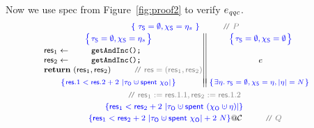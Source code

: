 Now we use spec from Figure~\ref{fig:proof2} to verify $e_{\mathit{qqc}}$.
%
\[
{\small{
\!\!\!\!\!\!\!\!
\begin{array}{c}
  ~~~~~~~~\spec{~
  \tkns = \emptyset,
  \hists = \gists
~} ~\comm{P}
\\[2pt]
%
% 
  \begin{tabular}{c || c}
$
\spec{\!\!\!
    \begin{array}{c}
    \tkns = \emptyset,
    \hists = \gists
  \end{array}\!\!\!}
$
&
$
\spec{\!\!\!\begin{array}{c}
    \tkns = \emptyset,
    \hists = \emptyset
  \end{array}\!\!\!}
$
\\[3pt]
   $\begin{array}{l}
      \res_1 \Asgn \esc{getAndInc();}\\[1pt]
      \res_2 \Asgn \esc{getAndInc();}\\[1pt]
      \kw{return}~(\res_1, \res_2) ~\comm{\res = (\res_1, \res_2)}\!\!\!
    \end{array}$
\!\!\!\!\!\!
& ${\small{e}}$ 
\\\\[-5pt] 
$
\spec{\!\!\!
{\scriptsize{
  \begin{array}{c}
    \res.1 < \res.2 + 2 \ |\tkno \hunion \Tomb~\histo|
  \end{array}
}}
  \!\!\!}$
\!\!
&
\!\!$\spec{\!\!\!
{\scriptsize{
  \begin{array}{c}
    \exists \gist \ldot 
    \tkns = \emptyset,
    \hists = \gist, 
    |\gist| = N
  \end{array}
}}
\!\!\!}$
\end{tabular}
\\\\[-5pt]
\comm{\res_1 := \res.1.1, \res_2 := \res.1.2}
\\\\[-6pt]
\spec{
\res_1 < \res_2 + 2 \ |\tkno \hunion \Tomb~(\histo \hunion \gist)|
}
\\[3pt]
~~~~~~~~\spec{
\res_1 < \res_2 + 2 \ |\tkno \hunion \Tomb~\histo| + 2 \ N
}@\ccon ~\comm{Q}
%
\end{array}
}}  
\]
